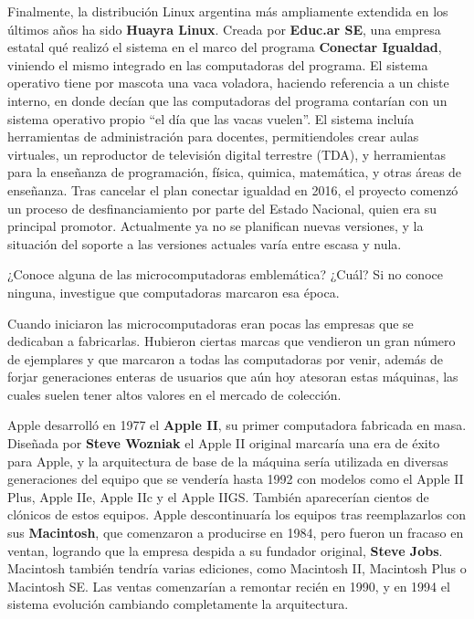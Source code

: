 Finalmente, la distribución Linux argentina más ampliamente extendida en los
últimos años ha sido \textbf{Huayra Linux}. Creada por \textbf{Educ.ar SE}, una
empresa estatal qué realizó el sistema en el marco del programa \textbf{Conectar
Igualdad}, viniendo el mismo integrado en las computadoras del programa. El
sistema operativo tiene por mascota una vaca voladora, haciendo referencia a un
chiste interno, en donde decían que las computadoras del programa contarían con
un sistema operativo propio ``el día que las vacas vuelen''. El sistema incluía
herramientas de administración para docentes, permitiendoles crear aulas
virtuales, un reproductor de televisión digital terrestre (TDA), y herramientas
para la enseñanza de programación, física, quimica, matemática, y otras áreas de
enseñanza. Tras cancelar el plan conectar igualdad en 2016, el proyecto comenzó
un proceso de desfinanciamiento por parte del Estado Nacional, quien era su
principal promotor. Actualmente ya no se planifican nuevas versiones, y la
situación del soporte a las versiones actuales varía entre escasa y nula.
\vspace{1cm}

\begin{exercise}
¿Conoce alguna de las microcomputadoras emblemática? ¿Cuál? Si no conoce
ninguna, investigue que computadoras marcaron esa época.
\end{exercise}

Cuando iniciaron las microcomputadoras eran pocas las empresas que se dedicaban
a fabricarlas. Hubieron ciertas marcas que vendieron un gran número de
ejemplares y que marcaron a todas las computadoras por venir, además de forjar
generaciones enteras de usuarios que aún hoy atesoran estas máquinas, las cuales
suelen tener altos valores en el mercado de colección.

Apple desarrolló en 1977 el \textbf{Apple II}, su primer computadora fabricada
en masa. Diseñada por \textbf{Steve Wozniak} el Apple II original marcaría una
era de éxito para Apple, y la arquitectura de base de la máquina sería utilizada
en diversas generaciones del equipo que se vendería hasta 1992 con modelos como
el Apple II Plus, Apple IIe, Apple IIc y el Apple IIGS. También aparecerían
cientos de clónicos de estos equipos. Apple descontinuaría los equipos tras
reemplazarlos con sus \textbf{Macintosh}, que comenzaron a producirse en 1984,
pero fueron un fracaso en ventan, logrando que la empresa despida a su fundador
original, \textbf{Steve Jobs}. Macintosh también tendría varias ediciones, como
Macintosh II, Macintosh Plus o Macintosh SE. Las ventas comenzarían a remontar
recién en 1990, y en 1994 el sistema evolución cambiando completamente la
arquitectura.

